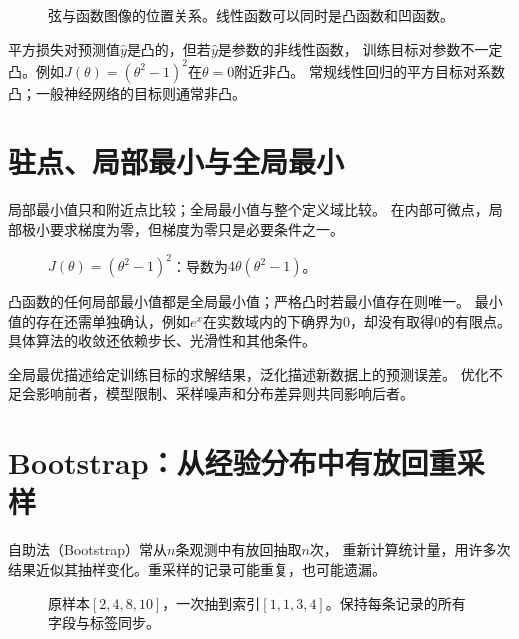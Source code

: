 \begin{figure}[htbp]
\centering
\caption{弦与函数图像的位置关系。线性函数可以同时是凸函数和凹函数。}
\par\smallskip
{}
\end{figure}

平方损失对预测值$\hat y$是凸的，但若$\hat y$是参数的非线性函数，
训练目标对参数不一定凸。例如$J(\theta)=(\theta^2-1)^2$在$\theta=0$附近非凸。
常规线性回归的平方目标对系数凸；一般神经网络的目标则通常非凸。


\section{驻点、局部最小与全局最小}
\label{sec:tools-minima}
局部最小值只和附近点比较；全局最小值与整个定义域比较。
在内部可微点，局部极小要求梯度为零，但梯度为零只是必要条件之一。

\begin{figure}[htbp]
\centering
\caption{$J(\theta)=(\theta^2-1)^2$：导数为$4\theta(\theta^2-1)$。}
\par\smallskip
{}
\end{figure}

凸函数的任何局部最小值都是全局最小值；严格凸时若最小值存在则唯一。
最小值的存在还需单独确认，例如$e^x$在实数域内的下确界为0，却没有取得0的有限点。
具体算法的收敛还依赖步长、光滑性和其他条件。

全局最优描述给定训练目标的求解结果，泛化描述新数据上的预测误差。
优化不足会影响前者，模型限制、采样噪声和分布差异则共同影响后者。

\section{Bootstrap：从经验分布中有放回重采样}
\label{sec:tools-bootstrap}
自助法（Bootstrap）常从$n$条观测中有放回抽取$n$次，
重新计算统计量，用许多次结果近似其抽样变化。重采样的记录可能重复，也可能遗漏。

\begin{figure}[htbp]
\centering
\caption{原样本$[2,4,8,10]$，一次抽到索引$[1,1,3,4]$。保持每条记录的所有字段与标签同步。}
\par\smallskip
{}
\end{figure}

